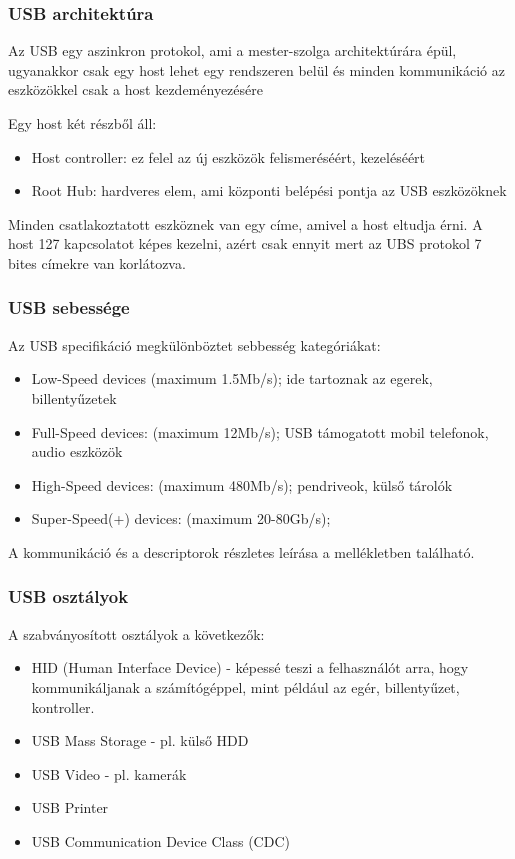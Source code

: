 \subsubsection{USB architektúra}
Az USB egy aszinkron protokol, ami a mester-szolga architektúrára épül, ugyanakkor csak egy host lehet egy rendszeren belül és minden kommunikáció az eszközökkel csak a host kezdeményezésére 

Egy host két részből áll:

\begin{itemize}
    \item Host controller: ez felel az új eszközök felismeréséért, kezeléséért
    \item Root Hub: hardveres elem, ami központi belépési pontja az USB eszközöknek
\end{itemize}

Minden csatlakoztatott eszköznek van egy címe, amivel a host eltudja érni. A host 127 kapcsolatot képes kezelni,  azért csak ennyit mert az UBS protokol 7 bites címekre van korlátozva.

\subsubsection{USB sebessége}

Az USB specifikáció megkülönböztet sebbesség kategóriákat:

\begin{itemize}
    \item Low-Speed devices (maximum 1.5Mb/s); ide tartoznak az egerek, billentyűzetek
    \item Full-Speed devices:  (maximum 12Mb/s); USB támogatott mobil telefonok, audio eszközök
    \item High-Speed devices:  (maximum 480Mb/s); pendriveok, külső tárolók
    \item Super-Speed(+) devices:  (maximum 20-80Gb/s);
\end{itemize}

A kommunikáció és a descriptorok részletes leírása a mellékletben található.


\subsubsection{USB osztályok}

A szabványosított osztályok a következők:

\begin{itemize}
    \item HID (Human Interface Device) - képessé teszi a felhasználót arra, hogy kommunikáljanak a számítógéppel, mint például az egér, billentyűzet, kontroller.
    \item USB Mass Storage - pl. külső HDD
    \item USB Video - pl. kamerák
    \item USB Printer
    \item USB Communication Device Class (CDC)
\end{itemize}

